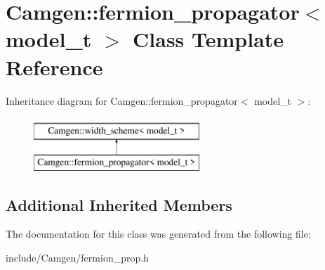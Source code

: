 \hypertarget{a00219}{\section{Camgen\-:\-:fermion\-\_\-propagator$<$ model\-\_\-t $>$ Class Template Reference}
\label{a00219}
}
Inheritance diagram for Camgen\-:\-:fermion\-\_\-propagator$<$ model\-\_\-t $>$\-:\begin{figure}[H]
\begin{center}
\leavevmode
\includegraphics[height=2.000000cm]{a00219}
\end{center}
\end{figure}
\subsection*{Additional Inherited Members}


The documentation for this class was generated from the following file\-:\begin{DoxyCompactItemize}
\item 
include/\-Camgen/fermion\-\_\-prop.\-h\end{DoxyCompactItemize}
